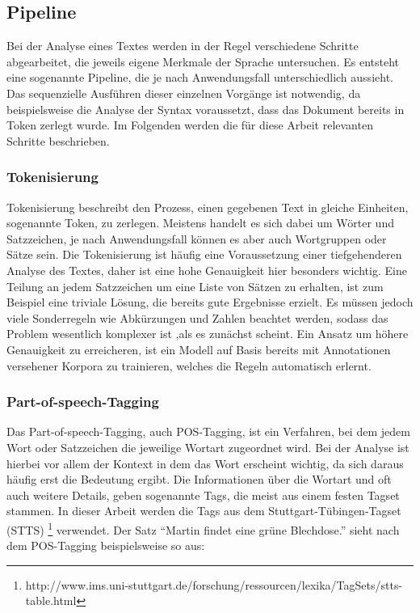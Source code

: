 
\subsection{Pipeline}\label{pipeline}
Bei der Analyse eines Textes werden in der Regel verschiedene Schritte abgearbeitet, die jeweils eigene Merkmale der Sprache untersuchen. Es entsteht eine sogenannte Pipeline, die je nach Anwendungsfall unterschiedlich aussieht. Das sequenzielle Ausführen dieser einzelnen Vorgänge ist notwendig, da beispielsweise die Analyse der Syntax voraussetzt, dass das Dokument bereits in Token zerlegt wurde. Im Folgenden werden die für diese Arbeit relevanten Schritte beschrieben.


\subsubsection*{Tokenisierung}
Tokenisierung beschreibt den Prozess, einen gegebenen Text in gleiche Einheiten, sogenannte Token, zu zerlegen. Meistens handelt es sich dabei um Wörter und Satzzeichen, je nach Anwendungsfall können es aber auch Wortgruppen oder Sätze sein. Die Tokenisierung ist häufig eine Voraussetzung einer tiefgehenderen Analyse des Textes, daher ist eine hohe Genauigkeit hier besonders wichtig. Eine Teilung an jedem Satzzeichen um eine Liste von Sätzen zu erhalten, ist zum Beispiel eine triviale Lösung, die bereits gute Ergebnisse erzielt. Es müssen jedoch viele Sonderregeln wie Abkürzungen und Zahlen beachtet werden, sodass das Problem wesentlich komplexer ist ,als es zunächst scheint. Ein Ansatz um höhere Genauigkeit zu erreicheren, ist ein Modell auf Basis bereits mit Annotationen versehener Korpora zu trainieren, welches die Regeln automatisch erlernt.

\subsubsection*{Part-of-speech-Tagging}
Das Part-of-speech-Tagging, auch POS-Tagging, ist ein Verfahren, bei dem jedem Wort oder Satzzeichen die jeweilige Wortart zugeordnet wird. Bei der Analyse ist hierbei vor allem der Kontext in dem das Wort erscheint wichtig, da sich daraus häufig erst die Bedeutung ergibt. Die Informationen über die Wortart und oft auch weitere Details, geben sogenannte Tags, die meist aus einem festen Tagset stammen. In dieser Arbeit werden die Tags aus dem Stuttgart-Tübingen-Tagset (STTS) \footnote{http://www.ims.uni-stuttgart.de/forschung/ressourcen/lexika/TagSets/stts-table.html} verwendet. Der Satz "`Martin findet eine grüne Blechdose."' sieht nach dem POS-Tagging beispielsweise so aus:

